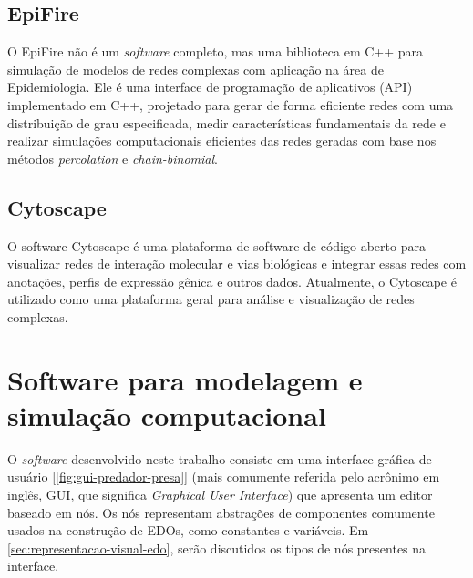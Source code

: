 \documentclass[
	12pt,				%
	openright,			%
	oneside,			%
	a4paper,			%
	main=brazil,
	english,			%
	]{ufsj-abntex2}
\begin{document}
\section{EpiFire}

O EpiFire \cite{epifire} não é um \textit{software} completo, mas uma biblioteca em C++ para simulação de modelos de redes complexas com aplicação na área de Epidemiologia. Ele é uma interface de programação de aplicativos (API) implementado em C++, projetado para gerar de forma eficiente redes com uma distribuição de grau especificada, medir características fundamentais da rede e realizar simulações computacionais eficientes das redes geradas com base nos métodos \textit{percolation} e \textit{chain-binomial}. 

\section{Cytoscape}

O software Cytoscape \cite{shannon2003cytoscape} é uma plataforma de software de código aberto para visualizar redes de interação molecular e vias biológicas e integrar essas redes com anotações, perfis de expressão gênica e outros dados. Atualmente, o Cytoscape é utilizado como uma plataforma geral para análise e visualização de redes complexas. 



\chapter{Software para modelagem e simulação computacional}
\label{chap:metodologia}
\label{chap:software-para-modelagem}

O \textit{software} desenvolvido neste trabalho consiste em uma interface gráfica de usuário [\ref{fig:gui-predador-presa}] (mais comumente referida pelo acrônimo em inglês, GUI, que significa \textit{Graphical User Interface}) que apresenta um editor baseado em nós. Os nós representam abstrações de componentes comumente usados na construção de EDOs, como constantes e variáveis. Em \ref{sec:representacao-visual-edo}, serão discutidos os tipos de nós presentes na interface.
\end{document}
